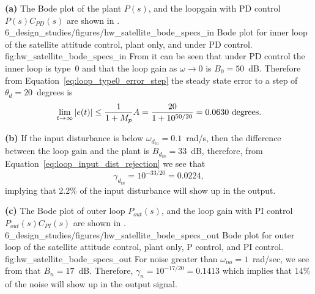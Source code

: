 
{\bf (a)} 
The Bode plot of the plant $P(s)$, and the loopgain with PD control $P(s)C_{PD}(s)$ are shown in .
	{6_design_studies/figures/hw_satellite_bode_specs_in}
	{Bode plot for inner loop of the satellite attitude control, plant only, and under PD control.}
	{fig:hw_satellite_bode_specs_in}
From  it can be seen that under PD control the inner loop is type~0 and that the loop gain as $\omega\to 0$ is $B_0=50$~dB.  Therefore from Equation~\eqref{eq:loop_type0_error_step}  the steady state error to a step of $\theta_d = 20$~degrees is 
\[
\lim_{t\to\infty}\left|e(t)\right| \leq \frac{1}{1+M_p} A = \frac{20}{1+10^{50/20}} = 0.0630\text{~degrees}.
\]

{\bf (b)} 
If the input disturbance is below $\omega_{d_{in}} = 0.1$~rad/s, then the difference between the loop gain and the plant is $B_{d_{in}}=33$~dB, therefore, from Equation~\eqref{eq:loop_input_dist_rejection} we see that 
\[
\gamma_{d_{in}} = 10^{-33/20} = 0.0224,
\]
implying that 2.2\% of the input disturbance will show up in the output.

{\bf (c)} 
The Bode plot of outer loop $P_{out}(s)$, and the loop gain with PI control $P_{out}(s)C_{PI}(s)$ are shown in .
	{6_design_studies/figures/hw_satellite_bode_specs_out}
	{Bode plot for outer loop of the satellite attitude control, plant only, P control, and PI control.}
	{fig:hw_satellite_bode_specs_out}
For noise greater than $\omega_{no}=1$~rad/sec, we see from  that $B_n = 17$~dB.  Therefore, $\gamma_n = 10^{-17/20} = 0.1413$ which implies that $14$\% of the noise will show up in the output signal.
